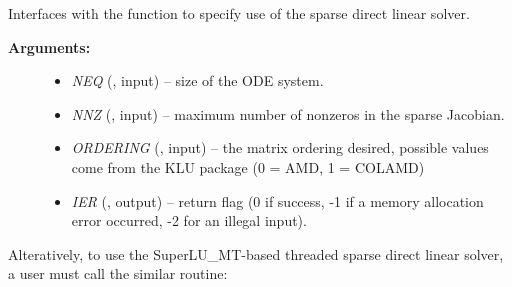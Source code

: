\documentclass[letterpaper,10pt,english]{sphinxmanual}
\begin{document}
\begin{fulllineitems}
\label{f_interface/Usage:f/_/FARKKLU}
Interfaces with the {\hyperref[c_interface/User_callable:c.ARKKLU]{\emph{}}} function to
specify use of the sparse direct linear solver.
\begin{description}
\item[{\textbf{Arguments:}}] \leavevmode\begin{itemize}
\item {} 
\emph{NEQ} (, input) -- size of the ODE system.

\item {} 
\emph{NNZ} (, input) -- maximum number of nonzeros in
the sparse Jacobian.

\item {} 
\emph{ORDERING} (, input) -- the matrix ordering desired,
possible values come from the KLU package (0 = AMD, 1 = COLAMD)

\item {} 
\emph{IER} (, output) -- return flag (0 if success, -1 if a
memory allocation error occurred, -2 for an illegal input).

\end{itemize}

\end{description}

\end{fulllineitems}


Alteratively, to use the SuperLU\_MT-based threaded sparse direct
linear solver, a user must call the similar {\hyperref[f_interface/Usage:f/_/FARKSUPERLUMT]{\emph{}}}
routine:
\end{document}
